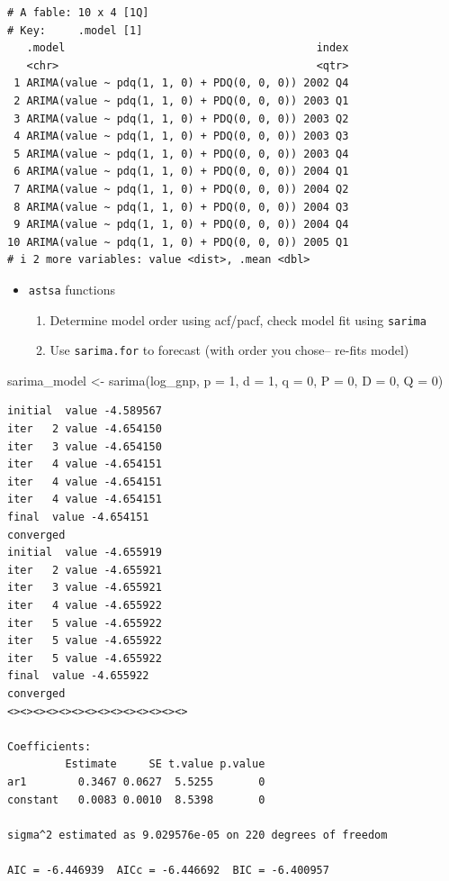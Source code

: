 \documentclass[
  letterpaper,
  DIV=11,
  numbers=noendperiod]{scrartcl}
\newenvironment{Shaded}{\begin{snugshade}}{\end{snugshade}}
\newcommand{\AttributeTok}[1]{\textcolor[rgb]{0.40,0.45,0.13}{#1}}
\newcommand{\DecValTok}[1]{\textcolor[rgb]{0.68,0.00,0.00}{#1}}
\newcommand{\FunctionTok}[1]{\textcolor[rgb]{0.28,0.35,0.67}{#1}}
\newcommand{\NormalTok}[1]{\textcolor[rgb]{0.00,0.23,0.31}{#1}}
\newcommand{\OtherTok}[1]{\textcolor[rgb]{0.00,0.23,0.31}{#1}}
\providecommand{\tightlist}{%
  \setlength{\itemsep}{0pt}\setlength{\parskip}{0pt}}\usepackage{longtable,booktabs,array}
\begin{document}
\begin{verbatim}
# A fable: 10 x 4 [1Q]
# Key:     .model [1]
   .model                                       index
   <chr>                                        <qtr>
 1 ARIMA(value ~ pdq(1, 1, 0) + PDQ(0, 0, 0)) 2002 Q4
 2 ARIMA(value ~ pdq(1, 1, 0) + PDQ(0, 0, 0)) 2003 Q1
 3 ARIMA(value ~ pdq(1, 1, 0) + PDQ(0, 0, 0)) 2003 Q2
 4 ARIMA(value ~ pdq(1, 1, 0) + PDQ(0, 0, 0)) 2003 Q3
 5 ARIMA(value ~ pdq(1, 1, 0) + PDQ(0, 0, 0)) 2003 Q4
 6 ARIMA(value ~ pdq(1, 1, 0) + PDQ(0, 0, 0)) 2004 Q1
 7 ARIMA(value ~ pdq(1, 1, 0) + PDQ(0, 0, 0)) 2004 Q2
 8 ARIMA(value ~ pdq(1, 1, 0) + PDQ(0, 0, 0)) 2004 Q3
 9 ARIMA(value ~ pdq(1, 1, 0) + PDQ(0, 0, 0)) 2004 Q4
10 ARIMA(value ~ pdq(1, 1, 0) + PDQ(0, 0, 0)) 2005 Q1
# i 2 more variables: value <dist>, .mean <dbl>
\end{verbatim}

\begin{itemize}
\item
  \texttt{astsa} functions

  \begin{enumerate}
  \def\labelenumi{\arabic{enumi}.}
  \tightlist
  \item
    Determine model order using acf/pacf, check model fit using
    \texttt{sarima}
  \item
    Use \texttt{sarima.for} to forecast (with order you chose-- re-fits
    model)
  \end{enumerate}
\end{itemize}

\begin{Shaded}
\begin{Highlighting}[]
\NormalTok{sarima\_model }\OtherTok{\textless{}{-}} \FunctionTok{sarima}\NormalTok{(log\_gnp, }\AttributeTok{p =} \DecValTok{1}\NormalTok{, }\AttributeTok{d =} \DecValTok{1}\NormalTok{, }\AttributeTok{q =} \DecValTok{0}\NormalTok{, }\AttributeTok{P =} \DecValTok{0}\NormalTok{, }\AttributeTok{D =} \DecValTok{0}\NormalTok{, }\AttributeTok{Q =} \DecValTok{0}\NormalTok{)}
\end{Highlighting}
\end{Shaded}

\begin{verbatim}
initial  value -4.589567 
iter   2 value -4.654150
iter   3 value -4.654150
iter   4 value -4.654151
iter   4 value -4.654151
iter   4 value -4.654151
final  value -4.654151 
converged
initial  value -4.655919 
iter   2 value -4.655921
iter   3 value -4.655921
iter   4 value -4.655922
iter   5 value -4.655922
iter   5 value -4.655922
iter   5 value -4.655922
final  value -4.655922 
converged
<><><><><><><><><><><><><><>
 
Coefficients: 
         Estimate     SE t.value p.value
ar1        0.3467 0.0627  5.5255       0
constant   0.0083 0.0010  8.5398       0

sigma^2 estimated as 9.029576e-05 on 220 degrees of freedom 
 
AIC = -6.446939  AICc = -6.446692  BIC = -6.400957 
 
\end{verbatim}
\end{document}
